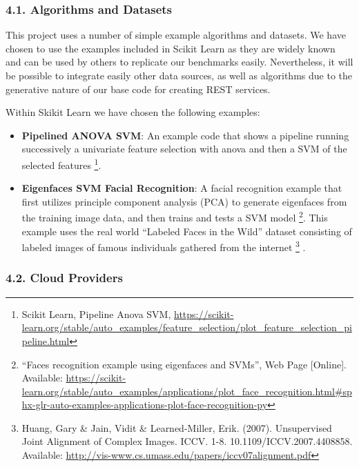 \hypertarget{algorithms-and-datasets}{%
\subsubsection{4.1. Algorithms and
Datasets}\label{algorithms-and-datasets}}

This project uses a number of simple example algorithms and datasets. We
have chosen to use the examples included in Scikit Learn as they are
widely known and can be used by others to replicate our benchmarks
easily. Nevertheless, it will be possible to integrate easily other data
sources, as well as algorithms due to the generative nature of our base
code for creating REST services.

Within Skikit Learn we have chosen the following examples:

\begin{itemize}
\item
  \textbf{Pipelined ANOVA SVM}: An example code that shows a pipeline
  running successively a univariate feature selection with anova and
  then a SVM of the selected features \footnote{Scikit Learn, Pipeline
    Anova SVM,
    \url{https://scikit-learn.org/stable/auto_examples/feature_selection/plot_feature_selection_pipeline.html}}.
\item
  \textbf{Eigenfaces SVM Facial Recognition}: A facial recognition
  example that first utilizes principle component analysis (PCA) to
  generate eigenfaces from the training image data, and then trains and
  tests a SVM model \footnote{``Faces recognition example using
    eigenfaces and SVMs'', Web Page {[}Online{]}. Available:
    \url{https://scikit-learn.org/stable/auto_examples/applications/plot_face_recognition.html\#sphx-glr-auto-examples-applications-plot-face-recognition-py}}.
  This example uses the real world ``Labeled Faces in the Wild'' dataset
  consisting of labeled images of famous individuals gathered from the
  internet \footnote{Huang, Gary \& Jain, Vidit \& Learned-Miller, Erik.
    (2007). Unsupervised Joint Alignment of Complex Images. ICCV. 1-8.
    10.1109/ICCV.2007.4408858. Available:
    \url{http://vis-www.cs.umass.edu/papers/iccv07alignment.pdf}} .
\end{itemize}

\hypertarget{cloud-providers}{%
\subsubsection{4.2. Cloud Providers}\label{cloud-providers}}


